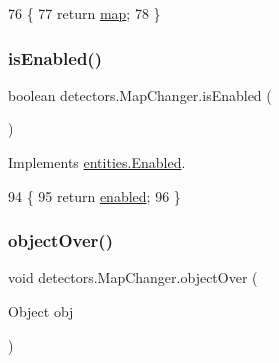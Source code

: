 \begin{DoxyCode}
76                            \{
77         \textcolor{keywordflow}{return} \mbox{\hyperlink{classdetectors_1_1_map_changer_ad642fa774f24afd2651f54d430608092}{map}};
78     \}
\end{DoxyCode}
\mbox{\label{classdetectors_1_1_map_changer_afea07edc6a03aef261b674c21dd9c50e}} 
\subsubsection{\texorpdfstring{is\+Enabled()}{isEnabled()}}
{\footnotesize\ttfamily boolean detectors.\+Map\+Changer.\+is\+Enabled (\begin{DoxyParamCaption}{ }\end{DoxyParamCaption})\hspace{0.3cm}{\ttfamily [inline]}}



Implements \mbox{\hyperlink{interfaceentities_1_1_enabled_a3d453026138fed321aed73816b331b49}{entities.\+Enabled}}.


\begin{DoxyCode}
94                                \{
95         \textcolor{keywordflow}{return} \mbox{\hyperlink{classdetectors_1_1_map_changer_a603d3a106676167a607d9acd5176f8f8}{enabled}};
96     \}
\end{DoxyCode}
\mbox{\label{classdetectors_1_1_map_changer_a4803cdf3ccad2502423706f266869a72}} 
\subsubsection{\texorpdfstring{object\+Over()}{objectOver()}}
{\footnotesize\ttfamily void detectors.\+Map\+Changer.\+object\+Over (\begin{DoxyParamCaption}\item[{Object}]{obj }\end{DoxyParamCaption})\hspace{0.3cm}{\ttfamily [inline]}}



